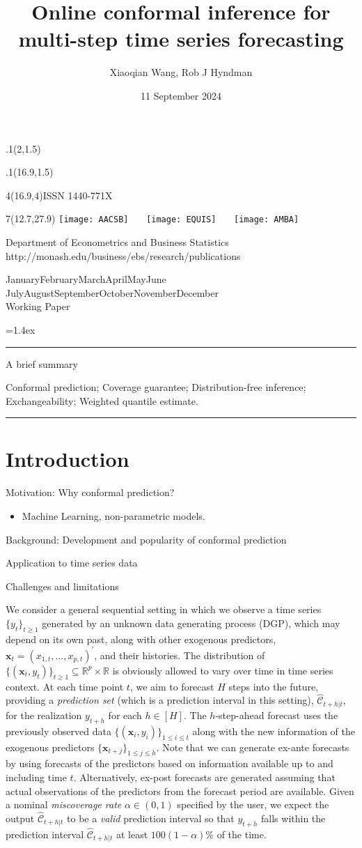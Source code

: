 \documentclass[
  11pt,
  a4paper,
]{article}
\title{Online conformal inference for multi-step time series
forecasting}
\date{11 September 2024}
\author{Xiaoqian Wang, Rob J Hyndman}
\makeatletter
\providecommand{\tightlist}{%
  \setlength{\itemsep}{0pt}\setlength{\parskip}{0pt}}\usepackage{longtable,booktabs,array}
\theoremstyle{plain}
\theoremstyle{plain}
\theoremstyle{remark}
\def\placefig#1#2#3#4{\begin{textblock}{.1}(#1,#2)\rlap{\texttt{[image: \#4]}}\end{textblock}}
\def\Date{\number\day}
\def\Month{\ifcase\month\or
 January\or February\or March\or April\or May\or June\or
 July\or August\or September\or October\or November\or December\fi}
\def\Year{\number\year}
\def\showjel{{\large\textsf{\textbf{JEL classification:}}~\@jel}}
\def\cover{{\sffamily\setcounter{page}{0}
        \thispagestyle{empty}
        \placefig{2}{1.5}{width=5cm}{monash2}
        \placefig{16.9}{1.5}{width=2.1cm}{MBSportrait}
        \begin{textblock}{4}(16.9,4)ISSN 1440-771X\end{textblock}
        \begin{textblock}{7}(12.7,27.9)\hfill
        \texttt{[image: AACSB]}~~~
        \texttt{[image: EQUIS]}~~~
        \texttt{[image: AMBA]}
        \end{textblock}
        \vspace*{2.5cm}
        \begin{center}\Large
        Department of Econometrics and Business Statistics\\[.5cm]
        \footnotesize http://monash.edu/business/ebs/research/publications
        \end{center}\vspace{2cm}
        \begin{center}
        \fbox{\parbox{14cm}{\begin{onehalfspace}\centering\Huge\vspace*{0.3cm}
                \textsf{\textbf{\expandafter{\@title}}}\vspace{1cm}\par
                \LARGE
                \expandafter{\@author}
                \end{onehalfspace}
        }}
        \end{center}
        \vfill
                \begin{center}\Large
                \Month~\Year\\[1cm]
                Working Paper \@wp
        \end{center}\vspace*{2cm}}}
\def\pageone{{\sffamily\setstretch{1}%
        \thispagestyle{empty}%
        \vbox to \textheight{%
        \raggedright\baselineskip=1.2cm
     {\fontsize{24.88}{30}\sffamily\textbf{\expandafter{\@title}}}
        \vspace{2cm}\par
        \hspace{1cm}\parbox{14cm}{\sffamily\large\@addresses}\vspace{1cm}\vfill
        \hspace{1cm}{\large\Date~\Month~\Year}\\[1cm]
        \hspace{1cm}\showjel\vss}}}
\def\blindtitle{{\sffamily
     \thispagestyle{plain}\raggedright\baselineskip=1.2cm
     {\fontsize{24.88}{30}\sffamily\textbf{\expandafter{\@title}}}\vspace{1cm}\par
        }}
\def\titlepage{{\cover\newpage\pageone\newpage\blindtitle}}
\let\maketitle\titlepage
\newenvironment{keywords}{\par\vspace{0.5cm}\noindent{\sffamily\textbf{Keywords:}}}{\vspace{0.25cm}\par\hrule\vspace{0.5cm}\par}
\renewenvironment{abstract}{\begin{minipage}{\textwidth}\parskip=1.4ex\noindent
\hrule\vspace{0.1cm}\par{\sffamily\textbf{\abstractname}}\newline\setstretch{1}}
  {\end{minipage}}
\makeatother
\begin{document}
\maketitle

\begin{abstract}
A brief summary
\end{abstract}

\begin{keywords}
  Conformal prediction; Coverage guarantee; Distribution-free
inference; Exchangeability; 
  Weighted quantile estimate.
\end{keywords}

\section{Introduction}\label{sec-intro}

Motivation: Why conformal prediction?

\begin{itemize}
\tightlist
\item
  Machine Learning, non-parametric models.
\end{itemize}

Background: Development and popularity of conformal prediction

Application to time series data

Challenges and limitations

We consider a general sequential setting in which we observe a time
series \(\{y_t\}_{t \geq 1}\) generated by an unknown data generating
process (DGP), which may depend on its own past, along with other
exogenous predictors, \(\bm{x}_t=(x_{1,t},\ldots,x_{p,t})^{\prime}\),
and their histories. The distribution of
\(\{(\bm{x}_t, y_t)\}_{t \geq 1} \subseteq \mathbb{R}^p \times \mathbb{R}\)
is obviously allowed to vary over time in time series context. At each
time point \(t\), we aim to forecast \(H\) steps into the future,
providing a \emph{prediction set} (which is a prediction interval in
this setting), \(\hat{\mathcal{C}}_{t+h|t}\), for the realization
\(y_{t+h}\) for each \(h\in[H]\). The \(h\)-step-ahead forecast uses the
previously observed data \(\{(\bm{x}_i, y_i)\}_{1 \leq i \leq t}\) along
with the new information of the exogenous predictors
\(\{\bm{x}_{t+j}\}_{1\leq j\leq h}\). Note that we can generate ex-ante
forecasts by using forecasts of the predictors based on information
available up to and including time \(t\). Alternatively, ex-post
forecasts are generated assuming that actual observations of the
predictors from the forecast period are available. Given a nominal
\emph{miscoverage rate} \(\alpha \in (0,1)\) specified by the user, we
expect the output \(\hat{\mathcal{C}}_{t+h|t}\) to be a \emph{valid}
prediction interval so that \(y_{t+h}\) falls within the prediction
interval \(\hat{\mathcal{C}}_{t+h|t}\) at least \(100(1-\alpha)\%\) of
the time.
\end{document}

